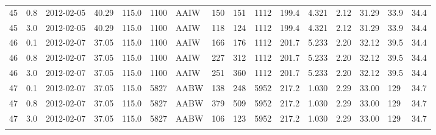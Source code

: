 {{\begin{landscape}
\begin{longtable}{llllllllllllllll}
45 & 0.8 & 2012-02-05 & \textminus{}40.29 & 115.0 & 1100 & AAIW & 150 & 151 & 1112 & 199.4 & 4.321 & 2.12 & 31.29 & 33.9 & 34.4\\
45 & 3.0 & 2012-02-05 & \textminus{}40.29 & 115.0 & 1100 & AAIW & 118 & 124 & 1112 & 199.4 & 4.321 & 2.12 & 31.29 & 33.9 & 34.4\\
46 & 0.1 & 2012-02-07 & \textminus{}37.05 & 115.0 & 1100 & AAIW & 166 & 176 & 1112 & 201.7 & 5.233 & 2.20 & 32.12 & 39.5 & 34.4\\
46 & 0.8 & 2012-02-07 & \textminus{}37.05 & 115.0 & 1100 & AAIW & 227 & 312 & 1112 & 201.7 & 5.233 & 2.20 & 32.12 & 39.5 & 34.4\\
46 & 3.0 & 2012-02-07 & \textminus{}37.05 & 115.0 & 1100 & AAIW & 251 & 360 & 1112 & 201.7 & 5.233 & 2.20 & 32.12 & 39.5 & 34.4\\
47 & 0.1 & 2012-02-07 & \textminus{}37.05 & 115.0 & 5827 & AABW & 138 & 248 & 5952 & 217.2 & 1.030 & 2.29 & 33.00 & 129 & 34.7\\
47 & 0.8 & 2012-02-07 & \textminus{}37.05 & 115.0 & 5827 & AABW & 379 & 509 & 5952 & 217.2 & 1.030 & 2.29 & 33.00 & 129 & 34.7\\
47 & 3.0 & 2012-02-07 & \textminus{}37.05 & 115.0 & 5827 & AABW & 106 & 123 & 5952 & 217.2 & 1.030 & 2.29 & 33.00 & 129 & 34.7\\
\bottomrule
\label{tab:advectionfullsampledata}
\end{longtable}
\end{landscape}
}}
